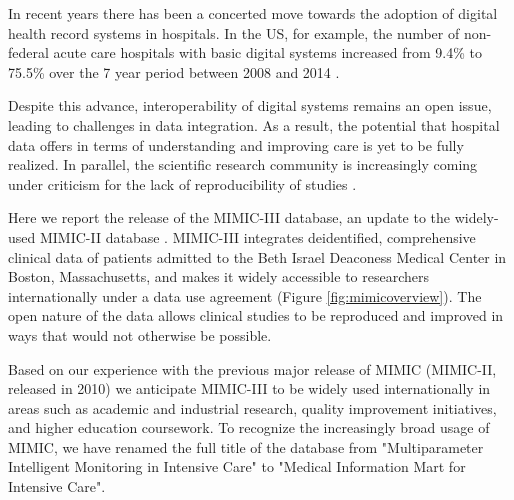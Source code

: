 \documentclass[english]{article}
\begin{document}

In recent years there has been a concerted move towards the adoption of digital health record systems in hospitals. In the US, for example, the number of non-federal acute care hospitals with basic digital systems increased from 9.4\% to 75.5\% over the 7 year period between 2008 and 2014 \cite{cite1}.

Despite this advance, interoperability of digital systems remains an open issue, leading to challenges in data integration. As a result, the potential that hospital data offers in terms of understanding and improving care is yet to be fully realized. In parallel, the scientific research community is increasingly coming under criticism for the lack of reproducibility of studies \cite{cite2}.

Here we report the release of the MIMIC-III database, an update to the widely-used MIMIC-II database \cite{cite3}. MIMIC-III integrates deidentified, comprehensive clinical data of patients admitted to the Beth Israel Deaconess Medical Center in Boston, Massachusetts, and makes it widely accessible to researchers internationally under a data use agreement (Figure \ref{fig:mimicoverview}). The open nature of the data allows clinical studies to be reproduced and improved in ways that would not otherwise be possible.

Based on our experience with the previous major release of MIMIC (MIMIC-II, released in 2010) we anticipate MIMIC-III to be widely used internationally in areas such as academic and industrial research, quality improvement initiatives, and higher education coursework. To recognize the increasingly broad usage of MIMIC, we have renamed the full title of the database from "Multiparameter Intelligent Monitoring in Intensive Care" to "Medical Information Mart for Intensive Care".
\end{document}
